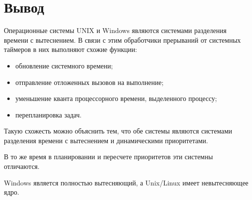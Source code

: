 \chapter*{Вывод}

Операционные системы {\ttfamily UNIX} и {\ttfamily Windows} являются системами разделения времени с вытеснением. В связи с этим обработчики прерываний от системных таймеров в них выполняют схожие функции:
\begin{itemize}
	\item обновление системного времени;
	\item отправление отложенных вызовов на выполнение;
	\item уменьшение кванта процессорного времени, выделенного процессу;
	\item перепланировка задач.
\end{itemize}

Такую схожесть можно объяснить тем, что обе системы являются системами разделения времени с вытеснением и динамическими приоритетами.

В то же время в планировании и пересчете приоритетов эти системны отличаются.

{\ttfamily Windows} является полностью вытесняющий, а {\ttfamily Unix/Linux} имеет невытесняющее ядро.